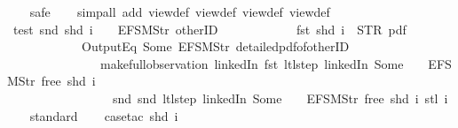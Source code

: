 \begin{isabellebody}
\ \ \isamarkupfalse%
\ safe\isanewline
\ \ \isamarkupfalse%
\ {\isacharparenleft}simp{\isacharunderscore}all\ add{\isacharcolon}\ view{\isacharunderscore}def\ view{}{\isacharunderscore}def\ view{}{\isacharunderscore}def\ view{}{\isacharunderscore}def{\isacharparenright}%
\endisatagproof
{\isafoldproof}%
%
\isadelimproof
\isanewline
%
\endisadelimproof
\isanewline
{}\isamarkupfalse%
\ test{\isacharcolon}\ {\isachardoublequoteopen}snd\ {\isacharparenleft}shd\ i{\isacharparenright}\ {\isacharbang}\ {}\ {\isacharequal}\ EFSM{\isachardot}Str\ {\isacharprime}{\isacharprime}otherID{\isacharprime}{\isacharprime}\ {\isasymlongrightarrow}\isanewline
\ \ \ \ \ \ \ \ \ \ \ fst\ {\isacharparenleft}shd\ i{\isacharparenright}\ {\isacharequal}\ STR\ {\isacharprime}{\isacharprime}pdf{\isacharprime}{\isacharprime}\ {\isasymlongrightarrow}\isanewline
\ \ \ \ \ \ \ \ \ \ \ {\isasymnot}\ OutputEq\ {\isacharbrackleft}Some\ {\isacharparenleft}EFSM{\isachardot}Str\ {\isacharprime}{\isacharprime}detailed{\isacharunderscore}pdf{\isacharunderscore}of{\isacharunderscore}otherID{\isacharprime}{\isacharprime}{\isacharparenright}{\isacharbrackright}\isanewline
\ \ \ \ \ \ \ \ \ \ \ \ \ \ \ {\isacharparenleft}make{\isacharunderscore}full{\isacharunderscore}observation\ linkedIn\ {\isacharparenleft}fst\ {\isacharparenleft}ltl{\isacharunderscore}step\ linkedIn\ {\isacharparenleft}Some\ {}{\isacharparenright}\ {\isacharless}{}\ {\isacharcolon}{\isacharequal}\ EFSM{\isachardot}Str\ {\isacharprime}{\isacharprime}free{\isacharprime}{\isacharprime}{\isachargreater}\ {\isacharparenleft}shd\ i{\isacharparenright}{\isacharparenright}{\isacharparenright}\isanewline
\ \ \ \ \ \ \ \ \ \ \ \ \ \ \ \ \ {\isacharparenleft}snd\ {\isacharparenleft}snd\ {\isacharparenleft}ltl{\isacharunderscore}step\ linkedIn\ {\isacharparenleft}Some\ {}{\isacharparenright}\ {\isacharless}{}\ {\isacharcolon}{\isacharequal}\ EFSM{\isachardot}Str\ {\isacharprime}{\isacharprime}free{\isacharprime}{\isacharprime}{\isachargreater}\ {\isacharparenleft}shd\ i{\isacharparenright}{\isacharparenright}{\isacharparenright}{\isacharparenright}\ {\isacharparenleft}stl\ i{\isacharparenright}{\isacharparenright}{\isachardoublequoteclose}\isanewline
%
\isadelimproof
\ \ %
\endisadelimproof
%
\isatagproof
{}\isamarkupfalse%
\ standard\isanewline
\ \ \isamarkupfalse%
\ {\isacharparenleft}case{\isacharunderscore}tac\ {\isachardoublequoteopen}shd\ i{\isachardoublequoteclose}{\isacharparenright}\isanewline

\end{isabellebody}
